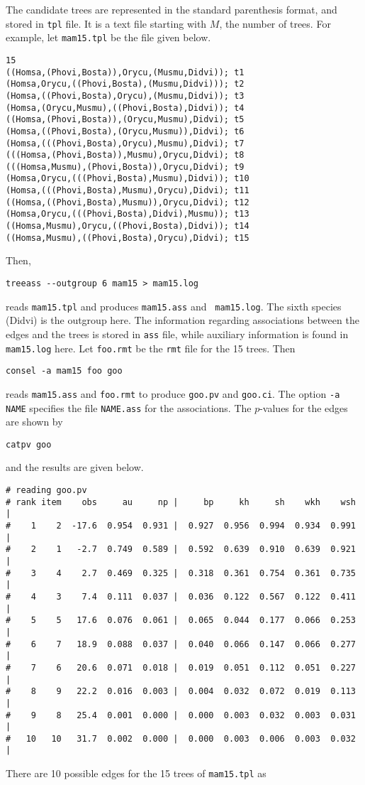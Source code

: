 \documentclass[12pt]{article}
\begin{document}
The candidate trees are represented in the standard parenthesis format,
and stored in {\tt tpl} file. It is a text file starting with $M$, the
number of trees.  For example, let {\tt mam15.tpl} be the file given
below.
{\small 
\begin{verbatim}
15
((Homsa,(Phovi,Bosta)),Orycu,(Musmu,Didvi)); t1
(Homsa,Orycu,((Phovi,Bosta),(Musmu,Didvi))); t2
(Homsa,((Phovi,Bosta),Orycu),(Musmu,Didvi)); t3
(Homsa,(Orycu,Musmu),((Phovi,Bosta),Didvi)); t4
((Homsa,(Phovi,Bosta)),(Orycu,Musmu),Didvi); t5
(Homsa,((Phovi,Bosta),(Orycu,Musmu)),Didvi); t6
(Homsa,(((Phovi,Bosta),Orycu),Musmu),Didvi); t7
(((Homsa,(Phovi,Bosta)),Musmu),Orycu,Didvi); t8
(((Homsa,Musmu),(Phovi,Bosta)),Orycu,Didvi); t9
(Homsa,Orycu,(((Phovi,Bosta),Musmu),Didvi)); t10
(Homsa,(((Phovi,Bosta),Musmu),Orycu),Didvi); t11
((Homsa,((Phovi,Bosta),Musmu)),Orycu,Didvi); t12
(Homsa,Orycu,(((Phovi,Bosta),Didvi),Musmu)); t13
((Homsa,Musmu),Orycu,((Phovi,Bosta),Didvi)); t14
((Homsa,Musmu),((Phovi,Bosta),Orycu),Didvi); t15
\end{verbatim}
}
Then, 
\begin{verbatim}
treeass --outgroup 6 mam15 > mam15.log	
\end{verbatim}
reads {\tt mam15.tpl} and produces {\tt mam15.ass} and {\tt
mam15.log}. The sixth species (Didvi) is the outgroup here.  The
information regarding associations between the edges and the trees is
stored in {\tt ass} file, while auxiliary information is found in {\tt
mam15.log} here. Let {\tt foo.rmt} be the {\tt rmt} file for the 15
trees. Then
\begin{verbatim}
consel -a mam15 foo goo
\end{verbatim}
reads {\tt mam15.ass} and {\tt foo.rmt} to produce {\tt goo.pv} and
{\tt goo.ci}. The option {\tt -a NAME} specifies the file {\tt NAME.ass}
for the associations. The $p$-values for the edges are shown by
\begin{verbatim}
catpv goo
\end{verbatim}
and the results are given below.
{\small
\begin{verbatim}
# reading goo.pv
# rank item    obs     au     np |     bp     kh     sh    wkh    wsh |
#    1    2  -17.6  0.954  0.931 |  0.927  0.956  0.994  0.934  0.991 |
#    2    1   -2.7  0.749  0.589 |  0.592  0.639  0.910  0.639  0.921 |
#    3    4    2.7  0.469  0.325 |  0.318  0.361  0.754  0.361  0.735 |
#    4    3    7.4  0.111  0.037 |  0.036  0.122  0.567  0.122  0.411 |
#    5    5   17.6  0.076  0.061 |  0.065  0.044  0.177  0.066  0.253 |
#    6    7   18.9  0.088  0.037 |  0.040  0.066  0.147  0.066  0.277 |
#    7    6   20.6  0.071  0.018 |  0.019  0.051  0.112  0.051  0.227 |
#    8    9   22.2  0.016  0.003 |  0.004  0.032  0.072  0.019  0.113 |
#    9    8   25.4  0.001  0.000 |  0.000  0.003  0.032  0.003  0.031 |
#   10   10   31.7  0.002  0.000 |  0.000  0.003  0.006  0.003  0.032 |
\end{verbatim}
} There are 10 possible edges for the 15 trees of {\tt mam15.tpl} as
\end{document}
